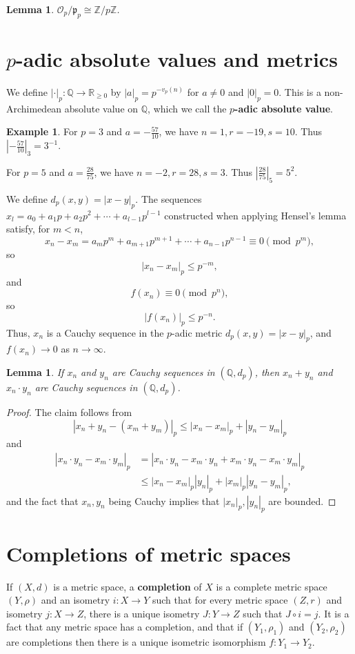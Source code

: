 \documentclass{article}
\theoremstyle{plain}
\newtheorem{lemma}[theorem]{Lemma}
\theoremstyle{definition}
\newtheorem{example}[theorem]{Example}
\begin{document}
\begin{lemma}
$\mathcal{O}_p/\mathfrak{p}_p \cong \mathbb{Z}/p\mathbb{Z}$.
\end{lemma}


\section{$p$-adic absolute values and metrics}
We define $|\cdot|_p:\mathbb{Q} \to \mathbb{R}_{\geq 0}$ by $|a|_p=p^{-v_p(n)}$ for $a \neq 0$ and $|0|_p=0$. 
This is a non-Archimedean absolute value on $\mathbb{Q}$, which we call
 the \textbf{$p$-adic absolute value}. 

\begin{example}
For 
$p=3$ and 
$a=-\frac{57}{10}$,
we have $n=1, r=-19, s=10$. 
Thus
$\left|-\frac{57}{10}\right|_3=3^{-1}$.

For $p=5$ and $a=\frac{28}{75}$, we have $n=-2, r=28, s=3$. Thus 
$\left| \frac{28}{75} \right|_5 = 5^2$.
\end{example}

We define $d_p(x,y)=|x-y|_p$.  The sequences $x_l = a_0+a_1p+a_2p^2+\cdots+a_{l-1} p^{l-1}$ constructed when applying Hensel's
lemma satisfy, for $m < n$,
\[
x_n-x_m = a_mp^m+a_{m+1}p^{m+1}+\cdots
+a_{n-1}p^{n-1} \equiv 0 \pmod{p^m},
\]
so
\[
|x_n-x_m|_p \leq p^{-m},
\]
and 
\[
f(x_n) \equiv 0 \pmod{p^n},
\]
so
\[
|f(x_n)|_p \leq p^{-n}.
\]
Thus, $x_n$ is a Cauchy sequence in the $p$-adic metric $d_p(x,y)=|x-y|_p$, and 
$f(x_n) \to 0$ as $n \to \infty$. 

\begin{lemma}
If $x_n$ and $y_n$ are  Cauchy sequences
in $(\mathbb{Q},d_p)$, then $x_n+y_n$ and $x_n\cdot y_n$ are Cauchy sequences in
$(\mathbb{Q},d_p)$.
\label{cauchysum}
\end{lemma}
\begin{proof}
The claim follows from
\[
|x_n+y_n-(x_m+y_m)|_p
\leq |x_n-x_m|_p + |y_n-y_m|_p
\]
and
\begin{align*}
|x_n\cdot y_n - x_m\cdot y_m|_p &=|x_n \cdot y_n - x_m \cdot y_n
+x_m\cdot y_n  - x_m \cdot y_m|_p\\
&\leq |x_n-x_m|_p |y_n|_p + |x_m|_p |y_n-y_m|_p,
\end{align*}
and the fact that $x_n,y_n$ being Cauchy implies that $|x_n|_p,|y_n|_p$ are bounded. 
\end{proof}


\section{Completions of metric spaces}
If $(X,d)$ is a metric space, a \textbf{completion} of $X$ is a complete metric space $(Y,\rho)$ and an
isometry $i:X \to Y$ such that for every metric space $(Z,r)$ and isometry $j:X \to Z$, there is a unique
isometry $J:Y \to Z$ such that $J \circ i = j$. It is a fact that any metric space has a completion,
and that if $(Y_1,\rho_1)$ and $(Y_2,\rho_2)$ are completions then there is a unique
isometric isomorphism $f:Y_1 \to Y_2$. 
\end{document}
